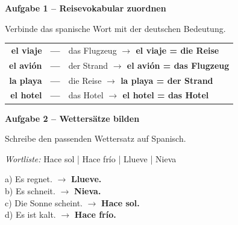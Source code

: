 \documentclass[11pt, a4paper]{article}
\newcommand{\fachfarbe}{spanisch}
\newcommand{\punktebox}[1]{\hfill\fbox{\small \_/#1}}
\newcommand{\lsg}[1]{\textcolor{loesung}{\textbf{#1}}}
\newenvironment{aufgabe}[1]{%
    \needspace{5\baselineskip}%
    \nopagebreak[4]%
    \vspace{10pt}
    \noindent\textbf{\textcolor{\fachfarbe}{Aufgabe #1}}
    \nopagebreak[4]%
    \vspace{5pt}
    \nopagebreak[4]%
    \begin{list}{}{\leftmargin=0pt}
    \item[]
}{%
    \end{list}
}
\newcommand{\es}[1]{\textcolor{\fachfarbe}{\textbf{#1}}}
\begin{document}
\vspace{10pt}


\begin{aufgabe}{1 -- Reisevokabular zuordnen}
Verbinde das spanische Wort mit der deutschen Bedeutung. \punktebox{4}
\end{aufgabe}

\begin{center}
\begin{tabular}{rcl}
\es{el viaje} & \lsg{---} & das Flugzeug \lsg{$\rightarrow$ el viaje = die Reise} \\[0.8em]
\es{el avión} & \lsg{---} & der Strand \lsg{$\rightarrow$ el avión = das Flugzeug} \\[0.8em]
\es{la playa} & \lsg{---} & die Reise \lsg{$\rightarrow$ la playa = der Strand} \\[0.8em]
\es{el hotel} & \lsg{---} & das Hotel \lsg{$\rightarrow$ el hotel = das Hotel} \\
\end{tabular}
\end{center}

\vspace{15pt}


\begin{aufgabe}{2 -- Wettersätze bilden}
Schreibe den passenden Wettersatz auf Spanisch. \punktebox{4}
\end{aufgabe}

\begin{vokabelkasten}
\textit{Wortliste:} Hace sol | Hace frío | Llueve | Nieva
\end{vokabelkasten}

\vspace{0.5em}

\noindent
a) Es regnet. $\rightarrow$ \lsg{Llueve.} \\[0.8em]
b) Es schneit. $\rightarrow$ \lsg{Nieva.} \\[0.8em]
c) Die Sonne scheint. $\rightarrow$ \lsg{Hace sol.} \\[0.8em]
d) Es ist kalt. $\rightarrow$ \lsg{Hace frío.}

\vspace{15pt}
\end{document}
